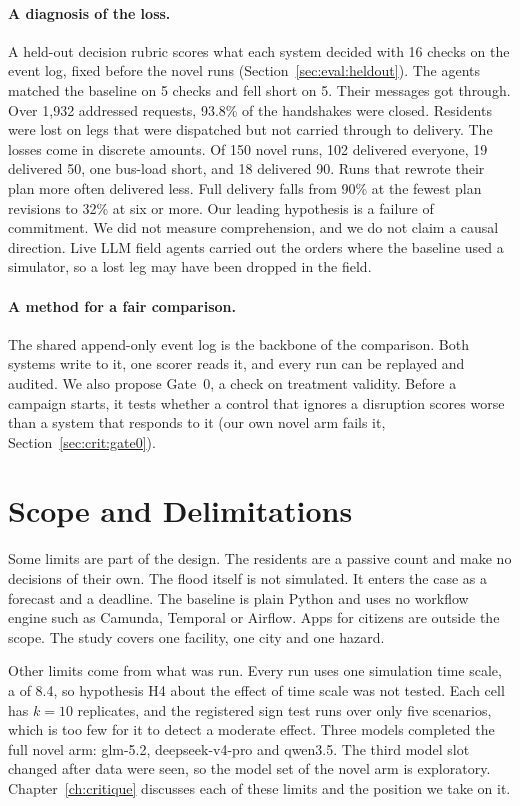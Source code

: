 \paragraph{A diagnosis of the loss.} A held-out decision rubric scores what
each system decided with 16 checks on the event log, fixed before the novel
runs (Section~\ref{sec:eval:heldout}). The agents matched the baseline on 5
checks and fell short on 5. Their messages got through. Over 1,932 addressed requests,
93.8\% of the handshakes were closed. Residents were lost on legs that were
dispatched but not carried through to delivery. The losses come in
discrete amounts. Of 150 novel runs, 102 delivered everyone, 19 delivered
50, one bus-load short, and 18 delivered 90. Runs that rewrote their plan more
often delivered less. Full delivery falls from 90\% at the fewest
plan revisions to 32\% at six or more. Our leading hypothesis is a failure
of commitment. We did not measure comprehension, and we do not claim
a causal direction. Live LLM field agents carried out the orders where
the baseline used a simulator, so a lost leg may have been dropped in the
field.

\paragraph{A method for a fair comparison.} The shared append-only event log is
the backbone of the comparison. Both systems write to it, one scorer reads it,
and every run can be replayed and audited. We also propose Gate~0, a check on
treatment validity. Before a campaign starts, it tests whether a control that
ignores a disruption scores worse than a system that responds to it (our own
novel arm fails it, Section~\ref{sec:crit:gate0}).

\section{Scope and Delimitations}
\label{sec:intro:scope}

Some limits are part of the design. The residents are a passive count and make
no decisions of their own. The flood itself is not simulated. It enters the
case as a forecast and a deadline. The baseline is plain Python and uses no
workflow engine such as Camunda, Temporal or Airflow. Apps for citizens are
outside the scope. The study covers one facility, one city and one hazard.

Other limits come from what was run. Every run uses one simulation time scale,
a  of 8.4, so hypothesis H4 about the effect of time scale
was not tested. Each cell has $k = 10$ replicates, and the registered sign
test runs over only five scenarios, which is too few for it to detect a
moderate effect. Three models completed the full
novel arm: glm-5.2, deepseek-v4-pro and qwen3.5. The third model slot changed
after data were seen, so the model set of the novel arm is exploratory.
Chapter~\ref{ch:critique} discusses each of these limits and the position we
take on it.

